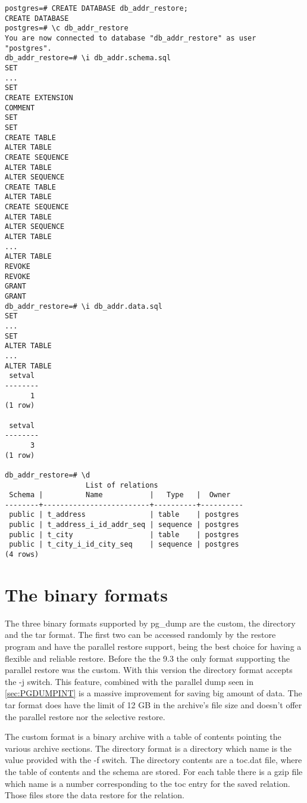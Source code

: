 \begin{lstlisting}[style=pgsql]
postgres=# CREATE DATABASE db_addr_restore;
CREATE DATABASE
postgres=# \c db_addr_restore 
You are now connected to database "db_addr_restore" as user "postgres".
db_addr_restore=# \i db_addr.schema.sql 
SET
...
SET
CREATE EXTENSION
COMMENT
SET
SET
CREATE TABLE
ALTER TABLE
CREATE SEQUENCE
ALTER TABLE
ALTER SEQUENCE
CREATE TABLE
ALTER TABLE
CREATE SEQUENCE
ALTER TABLE
ALTER SEQUENCE
ALTER TABLE
...
ALTER TABLE
REVOKE
REVOKE
GRANT
GRANT
db_addr_restore=# \i db_addr.data.sql 
SET
...
SET
ALTER TABLE
...
ALTER TABLE
 setval 
--------
      1
(1 row)

 setval 
--------
      3
(1 row)

db_addr_restore=# \d
                   List of relations
 Schema |          Name           |   Type   |  Owner   
--------+-------------------------+----------+----------
 public | t_address               | table    | postgres
 public | t_address_i_id_addr_seq | sequence | postgres
 public | t_city                  | table    | postgres
 public | t_city_i_id_city_seq    | sequence | postgres
(4 rows)

\end{lstlisting}



\section{The binary formats}
The three binary formats supported by pg\_dump are the custom, the directory and the tar format. 
The first two can be accessed randomly by the restore program and have the parallel restore 
support, being the best choice for having a flexible and reliable restore. Before the the 9.3 the 
only format supporting the parallel restore was the custom. With this version the directory 
format accepts the -j switch. This feature, combined with the parallel dump seen in 
\ref{sec:PGDUMPINT} is a massive improvement for saving big amount of data. The tar format does 
have the limit of 12 GB in the archive's file size and doesn't offer the parallel restore nor the 
selective restore. \newline

The custom format is a binary archive with a table of contents pointing the various archive 
sections. The directory format is a directory which name is the value provided with the -f switch. 
The directory contents are a toc.dat file, where the table of contents and the schema are stored. 
For each table there is a gzip file which name is a number corresponding to the toc entry for the 
saved relation. Those files store the data restore for the relation.\newline


